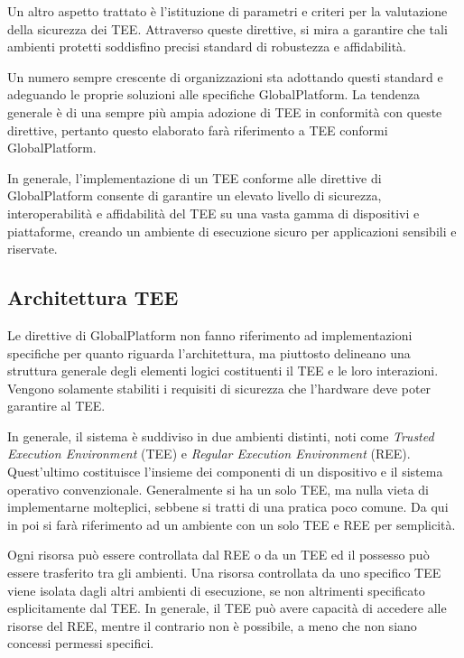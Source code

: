 \documentclass[12pt,italian]{report}
\begin{document}
	Un altro aspetto trattato è l'istituzione di parametri e criteri per la valutazione della sicurezza dei TEE. Attraverso queste direttive, si mira a garantire che tali ambienti protetti soddisfino precisi standard di robustezza e affidabilità.
	
	Un numero sempre crescente di organizzazioni sta adottando questi standard e adeguando le proprie soluzioni alle specifiche GlobalPlatform. La tendenza generale è di una sempre più ampia adozione di TEE in conformità con queste direttive, pertanto questo elaborato farà riferimento a TEE conformi GlobalPlatform.
	
	\bigbreak 
	
	In generale, l'implementazione di un TEE conforme alle direttive di GlobalPlatform consente di garantire un elevato livello di sicurezza, interoperabilità e affidabilità del TEE su una vasta gamma di dispositivi e piattaforme, creando un ambiente di esecuzione sicuro per applicazioni sensibili e riservate.
	
	\newpage
	
	\subsection{Architettura TEE}
	\label{subsec:architettura}
	Le direttive di GlobalPlatform non fanno riferimento ad implementazioni specifiche per quanto riguarda l'architettura, ma piuttosto delineano una struttura generale degli elementi logici costituenti il TEE e le loro interazioni. Vengono solamente stabiliti i requisiti di sicurezza che l'hardware deve poter garantire al TEE.
	
	\bigbreak
	
	In generale, il sistema è suddiviso in due ambienti distinti, noti come \textit{Trusted Execution Environment} (TEE) e \textit{Regular Execution Environment} (REE). Quest'ultimo costituisce l'insieme dei componenti di un dispositivo e il sistema operativo convenzionale. Generalmente si ha un solo TEE, ma nulla vieta di implementarne molteplici, sebbene si tratti di una pratica poco comune. Da qui in poi si farà riferimento ad un ambiente con un solo TEE e REE per semplicità.
	
	Ogni risorsa può essere controllata dal REE o da un TEE ed il possesso può essere trasferito tra gli ambienti. Una risorsa controllata da uno specifico TEE viene isolata dagli altri ambienti di esecuzione, se non altrimenti specificato esplicitamente dal TEE. In generale, il TEE può avere capacità di accedere alle risorse del REE, mentre il contrario non è possibile, a meno che non siano concessi permessi specifici. 
	
\end{document}
